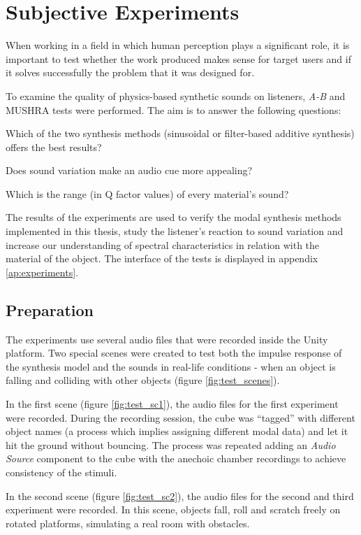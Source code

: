 \chapter{Subjective Experiments}\label{ch:tests}
When working in a field in which human perception plays a significant role, it is important to test whether the work produced makes sense for target users and if it solves successfully the problem that it was designed for.

To examine the quality of physics-based synthetic sounds on listeners, \textit{A-B} and \gls{MUSHRA} \cite{series2014method} tests were performed. The aim is to answer the following questions: \begin{inparaenum}[1)]
\item Which of the two synthesis methods (sinusoidal or filter-based additive synthesis) offers the best results? 
\item Does sound variation make an audio cue more appealing?
\item Which is the range (in \gls{Q} factor values) of every material's sound?
\end{inparaenum}
The results of the experiments are used to verify the modal synthesis methods implemented in this thesis, study the listener's reaction to sound variation and increase our understanding of spectral characteristics in relation with the material of the object. The interface of the tests is displayed in appendix \ref{ap:experiments}.

\section{Preparation}
The experiments use several audio files that were recorded inside the Unity\textsuperscript{\textregistered} platform. Two special scenes were created to test both the impulse response of the synthesis model and the sounds in real-life conditions - when an object is falling and colliding with other objects (figure \ref{fig:test_scenes}). 

In the first scene (figure \ref{fig:test_sc1}), the audio files for the first experiment were recorded. During the recording session, the cube was ``tagged'' with different object names (a process which implies assigning different modal data) and let it hit the ground without bouncing. The process was repeated adding an \textit{Audio Source} component to the cube with the anechoic chamber recordings to achieve consistency of the stimuli.

In the second scene (figure \ref{fig:test_sc2}), the audio files for the second and third experiment were recorded. In this scene, objects fall, roll and scratch freely on rotated platforms, simulating a real room with obstacles.

